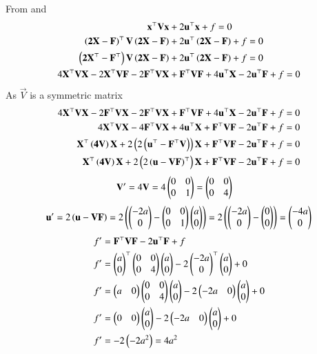 \documentclass[journal]{IEEEtran}
\begin{document}
From  and 
 \begin{align}
  \mathbf{x}^\top\mathbf{V}\mathbf{x} &+ 2\mathbf{u}^\top\mathbf{x} + f = 0\\
 \left( \mathbf{2\mathbf{X}-\mathbf{F} }\right)^\top\mathbf{V}\left(\mathbf{2\mathbf{X}-\mathbf{F} }\right)& + 2\mathbf{u}^\top\left(\mathbf{2\mathbf{X}-\mathbf{F}} \right) + f = 0 \\
  \left( \mathbf{2\mathbf{X}^\top-\mathbf{F}^\top }\right)\mathbf{V}\left(\mathbf{2\mathbf{X}-\mathbf{F} }\right) &+ 2\mathbf{u}^\top\left(\mathbf{2\mathbf{X}-\mathbf{F}} \right) + f = 0 \\
4\mathbf{X}^\top\mathbf{V}\mathbf{X}-2\mathbf{X}^\top\mathbf{V}\mathbf{F}-2\mathbf{F}^\top\mathbf{V}\mathbf{X}&+\mathbf{F}^\top\mathbf{V}\mathbf{F}+4\mathbf{u}^\top\mathbf{X}-2\mathbf{u}^\top\mathbf{F}+f=0
  \end{align}
  As $\vec{V}$ is a symmetric matrix
  \begin{align}
4\mathbf{X}^\top\mathbf{V}\mathbf{X}-2\mathbf{F}^\top\mathbf{V}\mathbf{X}-2\mathbf{F}^\top\mathbf{V}\mathbf{X}+\mathbf{F}^\top\mathbf{V}\mathbf{F}+4\mathbf{u}^\top\mathbf{X}-2\mathbf{u}^\top\mathbf{F}+f=0 \\
4\mathbf{X}^\top\mathbf{V}\mathbf{X}-4\mathbf{F}^\top\mathbf{V}\mathbf{X}+4\mathbf{u}^\top\mathbf{X}+\mathbf{F}^\top\mathbf{V}\mathbf{F}-2\mathbf{u}^\top\mathbf{F}+f=0\\
\mathbf{X}^\top\left(\mathbf{4V}\right)\mathbf{X}+2\left(2\left(\mathbf{u}^\top-\mathbf{F}^\top\mathbf{V}\right)\right)\mathbf{X}+\mathbf{F}^\top\mathbf{V}\mathbf{F}-2\mathbf{u}^\top\mathbf{F}+f=0\\
\mathbf{X}^\top\left(\mathbf{4V}\right)\mathbf{X}+2\left(2\left(\mathbf{u}-\mathbf{V}\mathbf{F}\right)^\top\right)\mathbf{X}+\mathbf{F}^\top\mathbf{V}\mathbf{F}-2\mathbf{u}^\top\mathbf{F}+f=0
 \end{align}
 \begin{align}
 \mathbf{V}'=4\mathbf{V}=4\begin{pmatrix}0& 0 \\0&1\end{pmatrix}&=\begin{pmatrix}0&0\\0&4\end{pmatrix}
 \end{align}
 \begin{align}
  \mathbf{u'}=2\left(\mathbf{u}-\mathbf{V}\mathbf{F}\right)=2\left(\begin{pmatrix}-2a\\0\end{pmatrix}-\begin{pmatrix}0&0\\0&1\end{pmatrix}\begin{pmatrix}a\\0\end{pmatrix}\right)=2\left(\begin{pmatrix}-2a\\0\end{pmatrix}-\begin{pmatrix}0\\0\end{pmatrix}\right)=\begin{pmatrix}-4a\\0\end{pmatrix}
  \end{align}
  \begin{align}
  f'&=\mathbf{F}^\top\mathbf{V}\mathbf{F}-2\mathbf{u}^\top\mathbf{F}+f \\
  f'&=\begin{pmatrix}a\\0\end{pmatrix}^\top\begin{pmatrix}0&0\\0&4\end{pmatrix}\begin{pmatrix}a\\0\end{pmatrix}-2\begin{pmatrix}-2a\\0\end{pmatrix}^\top\begin{pmatrix}a\\0\end{pmatrix}+0\\
  f'&=\begin{pmatrix}a&0\end{pmatrix}\begin{pmatrix}0&0\\0&4\end{pmatrix}\begin{pmatrix}a\\0\end{pmatrix}-2\begin{pmatrix}-2a&0\end{pmatrix}\begin{pmatrix}a\\0\end{pmatrix}+0\\
  f'&=\begin{pmatrix}0&0\end{pmatrix}\begin{pmatrix}a\\0\end{pmatrix}-2\begin{pmatrix}-2a&0\end{pmatrix}\begin{pmatrix}a\\0\end{pmatrix}+0\\
  f'&=-2\left(-2a^2\right)=4a^2
 \end{align}
\end{document}
